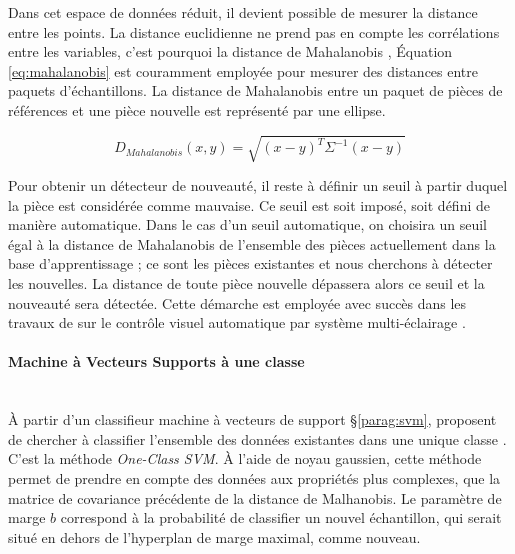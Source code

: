 Dans cet espace de données réduit, il devient possible de mesurer la distance entre les points.
La distance euclidienne ne prend pas en compte les corrélations entre les variables, c'est pourquoi la distance de Mahalanobis \cite{mahalanobis_generalised_1936}, Équation \ref{eq:mahalanobis}  est couramment employée pour mesurer des distances entre paquets d'échantillons.
La distance de Mahalanobis entre un paquet de pièces de références et une pièce nouvelle est représenté par une ellipse.

\begin{equation} \label{eq:mahalanobis}
D_{Mahalanobis}(x, y)=\sqrt{(x - y)^{T} \Sigma^{-1}(x-y)}
\end{equation}

Pour obtenir un détecteur de nouveauté, il reste à définir un seuil à partir duquel la pièce est considérée comme mauvaise.
Ce seuil est soit imposé, soit défini de manière automatique.
Dans le cas d'un seuil automatique, on choisira un seuil égal à la distance de Mahalanobis de l'ensemble des pièces actuellement dans la base d'apprentissage ; ce sont les pièces existantes et nous cherchons à détecter les nouvelles.
La distance de toute pièce nouvelle dépassera alors ce seuil et la nouveauté sera détectée.
Cette démarche est employée avec succès dans les travaux de \citeauthor{lacombe_exploitation_2018a} sur le contrôle visuel automatique par système multi-éclairage \cite{lacombe_exploitation_2018a}.

\paragraph{Machine à Vecteurs Supports à une classe}\mbox{} \\
À partir d'un classifieur machine à vecteurs de support §\ref{parag:svm}, \citeauthor{scholkopf_support_1999} proposent de chercher à classifier l'ensemble des données existantes dans une unique classe \cite{scholkopf_support_1999, scholkopf_estimating_2001}.
C'est la méthode \textit{One-Class SVM}.
À l'aide de noyau gaussien, cette méthode permet de prendre en compte des données aux propriétés plus complexes, que la matrice de covariance précédente de la distance de Malhanobis.
Le paramètre de marge $b$ correspond à la probabilité de classifier un nouvel échantillon, qui serait situé en dehors de l'hyperplan de marge maximal, comme nouveau.

